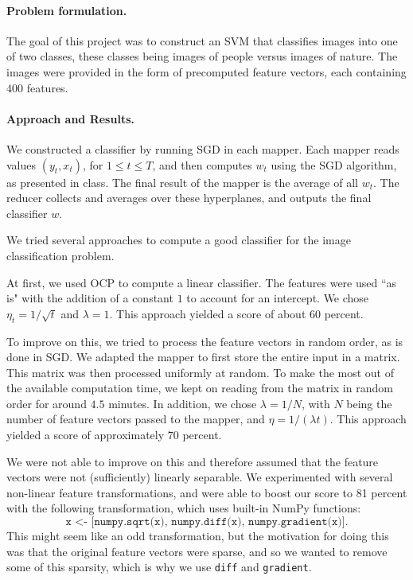 \documentclass[a4paper,11pt]{article}
\begin{document}
\paragraph{Problem formulation.\!\!\!}
The goal of this project was to construct an SVM that classifies images into one of two classes, these classes being images of people versus images of nature. The images were provided in the form of precomputed feature vectors, each containing $400$ features.

\paragraph{Approach and Results.\!\!\!}
We constructed a classifier by running SGD in each mapper. Each mapper reads values $(y_t,x_t)$, for $1\leq t\leq T$, and then computes $w_t$ using the SGD algorithm, as presented in class. The final result of the mapper is the average of
all $w_t$. The reducer collects and averages over these hyperplanes, and outputs the final classifier $w$.

We tried several approaches to compute a good classifier for the image classification problem.

At first, we used OCP to compute a linear classifier. The features were used ``as is" with the addition of a constant $1$ to account for an intercept. We chose $\eta_t=1/\sqrt{t}$ and $\lambda=1$. This approach yielded a score of about $60$ percent.

To improve on this, we tried to process the feature vectors in random order, as is done in SGD. We adapted the mapper to first store the entire input in a matrix. This matrix was then processed uniformly at random. To make the most out of the available computation time, we kept on reading from the matrix in random order for around $4.5$ minutes. In addition, we chose $\lambda=1/N$, with $N$ being the number of feature vectors passed to the mapper, and $\eta= 1/(\lambda t)$. 
This approach yielded a score of approximately 70 percent.

We were not able to improve on this and therefore assumed that the feature vectors were not (sufficiently)
linearly separable. We experimented with several non-linear feature transformations, and were able to boost our score to 81 percent with the following transformation, which uses built-in NumPy functions:
\begin{equation*}
\texttt{x <- [numpy.sqrt(x), numpy.diff(x), numpy.gradient(x)]}.
\end{equation*}
This might seem like an odd transformation, but the motivation for doing this was that the original feature vectors were sparse, and so we wanted to remove some of this sparsity, which is why we use \texttt{diff} and \texttt{gradient}.
\end{document}
